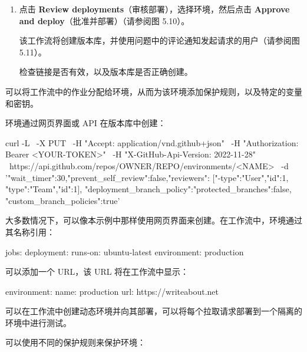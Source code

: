 \begin{enumerate}
\item 
点击 \textbf{Review deployments}（审核部署），选择环境，然后点击 \textbf{Approve and deploy}（批准并部署）（请参阅图 5.10）。


该工作流将创建版本库，并使用问题中的评论通知发起请求的用户（请参阅图 5.11）。


检查链接是否有效，以及版本库是否正确创建。

\end{enumerate}


可以将工作流中的作业分配给环境，从而为该环境添加保护规则，以及特定的变量和密钥。


环境通过网页界面或 API 在版本库中创建：

\begin{shell}
curl -L \
  -X PUT \
  -H "Accept: application/vnd.github+json" \
  -H "Authorization: Bearer <YOUR-TOKEN>" \
  -H "X-GitHub-Api-Version: 2022-11-28" \
  https://api.github.com/repos/OWNER/REPO/environments/<NAME> \
  -d '{"wait_timer":30,"prevent_self_review":false,"reviewers": [{"-type":"User","id":1}, {"type":"Team","id":1}], "deployment_branch_policy":{"protected_branches":false, "custom_branch_policies":true}}'
\end{shell}

大多数情况下，可以像本示例中那样使用网页界面来创建。在工作流中，环境通过其名称引用：

\begin{shell}
jobs:
  deployment:
    runs-on: ubuntu-latest
    environment: production
\end{shell}

可以添加一个 URL，该 URL 将在工作流中显示：

\begin{shell}
environment:
  name: production
  url: https://writeabout.net
\end{shell}

可以在工作流中创建动态环境并向其部署，可以将每个拉取请求部署到一个隔离的环境中进行测试。

可以使用不同的保护规则来保护环境：

